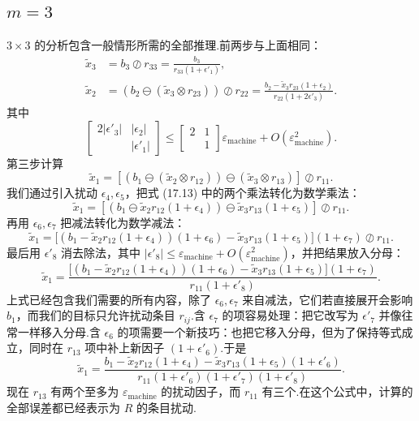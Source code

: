 \documentclass[UTF8,fontset=none,12pt]{ctexart}
\newcommand{\epsmach}{\varepsilon_{\mathrm{machine}}}
\theoremstyle{definition}
\begin{document}
\subsection*{$m=3$}

$3\times3$ 的分析包含一般情形所需的全部推理.前两步与上面相同：
\begin{align}
\widetilde x_3
&=b_3\oslash r_{33}=\frac{b_3}{r_{33}(1+\epsilon'_1)},
\tag{17.11}\\
\widetilde x_2
&=(b_2\ominus(\widetilde x_3\otimes r_{23}))\oslash r_{22}
=\frac{b_2-\widetilde x_3r_{23}(1+\epsilon_2)}{r_{22}(1+2\epsilon'_3)}.
\tag{17.12}
\end{align}
其中
\[
\begin{bmatrix}2|\epsilon'_3|&|\epsilon_2|\\&|\epsilon'_1|\end{bmatrix}
\le
\begin{bmatrix}2&1\\&1\end{bmatrix}\epsmach+O(\epsmach^2).
\]
第三步计算
\begin{equation}
\widetilde x_1=[(b_1\ominus(\widetilde x_2\otimes r_{12}))
\ominus(\widetilde x_3\otimes r_{13})]\oslash r_{11}.
\tag{17.13}
\end{equation}
我们通过引入扰动 $\epsilon_4,\epsilon_5$，把式 (17.13) 中的两个乘法转化为数学乘法：
\[
\widetilde x_1=[(b_1\ominus\widetilde x_2r_{12}(1+\epsilon_4))
\ominus\widetilde x_3r_{13}(1+\epsilon_5)]\oslash r_{11}.
\]
再用 $\epsilon_6,\epsilon_7$ 把减法转化为数学减法：
\[
\widetilde x_1=
\bigl[(b_1-\widetilde x_2r_{12}(1+\epsilon_4))(1+\epsilon_6)
-\widetilde x_3r_{13}(1+\epsilon_5)\bigr](1+\epsilon_7)\oslash r_{11}.
\]
最后用 $\epsilon'_8$ 消去除法，其中 $|\epsilon'_8|\le\epsmach+O(\epsmach^2)$，并把结果放入分母：
\[
\widetilde x_1=
\frac{\bigl[(b_1-\widetilde x_2r_{12}(1+\epsilon_4))(1+\epsilon_6)
-\widetilde x_3r_{13}(1+\epsilon_5)\bigr](1+\epsilon_7)}
{r_{11}(1+\epsilon'_8)}.
\]
上式已经包含我们需要的所有内容，除了 $\epsilon_6,\epsilon_7$ 来自减法，它们若直接展开会影响 $b_1$，而我们的目标只允许扰动条目 $r_{ij}$.含 $\epsilon_7$ 的项容易处理：把它改写为 $\epsilon'_7$ 并像往常一样移入分母.含 $\epsilon_6$ 的项需要一个新技巧：也把它移入分母，但为了保持等式成立，同时在 $r_{13}$ 项中补上新因子 $(1+\epsilon'_6)$.于是
\[
\widetilde x_1=
\frac{b_1-\widetilde x_2r_{12}(1+\epsilon_4)
-\widetilde x_3r_{13}(1+\epsilon_5)(1+\epsilon'_6)}
{r_{11}(1+\epsilon'_6)(1+\epsilon'_7)(1+\epsilon'_8)}.
\]
现在 $r_{13}$ 有两个至多为 $\epsmach$ 的扰动因子，而 $r_{11}$ 有三个.在这个公式中，计算的全部误差都已经表示为 $R$ 的条目扰动.
\end{document}

